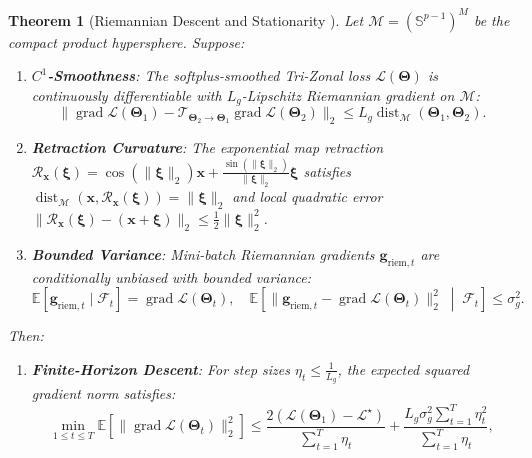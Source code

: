 \documentclass[journal]{IEEEtran}
\newtheorem{theorem}{Theorem}
\begin{document}
\begin{theorem}[Riemannian Descent and Stationarity \cite{bonnabel2013stochastic,absil2008optimization}]
\label{thm:convergence}
Let $\mathcal{M} = (\mathbb{S}^{p-1})^M$ be the compact product hypersphere. Suppose:
\begin{enumerate}
    \item[(A1)] \textbf{$C^1$-Smoothness}: The softplus-smoothed Tri-Zonal loss $\mathcal{L}(\boldsymbol{\Theta})$ is continuously differentiable with $L_g$-Lipschitz Riemannian gradient on $\mathcal{M}$:
    \begin{equation}
    \|\operatorname{grad}\mathcal{L}(\boldsymbol{\Theta}_1) - \mathcal{T}_{\boldsymbol{\Theta}_2\to\boldsymbol{\Theta}_1}\operatorname{grad}\mathcal{L}(\boldsymbol{\Theta}_2)\|_2 \le L_g \operatorname{dist}_{\mathcal{M}}(\boldsymbol{\Theta}_1, \boldsymbol{\Theta}_2).
    \end{equation}
    \item[(A2)] \textbf{Retraction Curvature}: The exponential map retraction $\mathcal{R}_{\mathbf{x}}(\boldsymbol{\xi}) = \cos(\|\boldsymbol{\xi}\|_2)\mathbf{x} + \frac{\sin(\|\boldsymbol{\xi}\|_2)}{\|\boldsymbol{\xi}\|_2}\boldsymbol{\xi}$ satisfies $\operatorname{dist}_{\mathcal{M}}(\mathbf{x}, \mathcal{R}_{\mathbf{x}}(\boldsymbol{\xi})) = \|\boldsymbol{\xi}\|_2$ and local quadratic error $\|\mathcal{R}_{\mathbf{x}}(\boldsymbol{\xi}) - (\mathbf{x} + \boldsymbol{\xi})\|_2 \le \frac{1}{2}\|\boldsymbol{\xi}\|_2^2$.
    \item[(A3)] \textbf{Bounded Variance}: Mini-batch Riemannian gradients $\mathbf{g}_{\text{riem},t}$ are conditionally unbiased with bounded variance:
    \begin{equation}
    \mathbb{E}[\mathbf{g}_{\text{riem},t}\mid\mathcal{F}_t] = \operatorname{grad}\mathcal{L}(\boldsymbol{\Theta}_t), \quad \mathbb{E}\left[\|\mathbf{g}_{\text{riem},t} - \operatorname{grad}\mathcal{L}(\boldsymbol{\Theta}_t)\|_2^2 \;\middle|\; \mathcal{F}_t\right] \le \sigma_g^2.
    \end{equation}
\end{enumerate}
Then:
\begin{enumerate}
    \item \textbf{Finite-Horizon Descent}: For step sizes $\eta_t \le \frac{1}{L_g}$, the expected squared gradient norm satisfies:
    \begin{equation}
    \min_{1 \le t \le T} \mathbb{E}\!\left[\|\operatorname{grad}\mathcal{L}(\boldsymbol{\Theta}_t)\|_2^2\right] \le \frac{2\left(\mathcal{L}(\boldsymbol{\Theta}_1) - \mathcal{L}^\star\right)}{\sum_{t=1}^T \eta_t} + \frac{L_g \sigma_g^2 \sum_{t=1}^T \eta_t^2}{\sum_{t=1}^T \eta_t},

\end{equation}
\end{enumerate}
\end{theorem}
\end{document}

